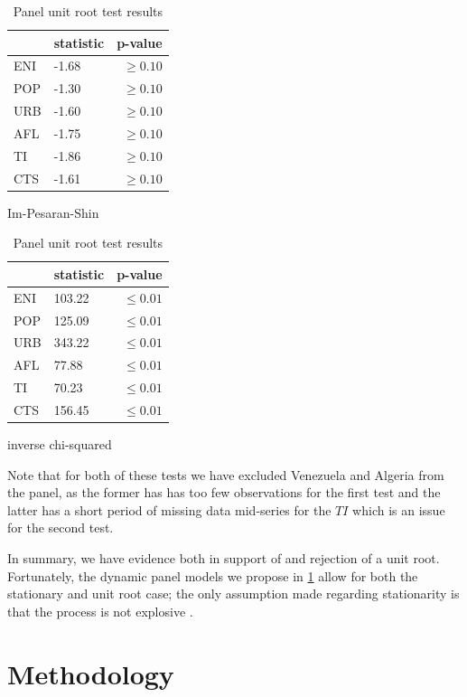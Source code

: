 \documentclass[12pt,a4paper]{article}
\begin{document}
\begin{table}[htbp]
\centering
\begin{subtable}{0.45\textwidth}
\centering
\begin{tabular}{llr}
\toprule
{} & statistic &      p-value \\
\midrule
ENI &     -1.68 &  $\geq 0.10$ \\
POP &     -1.30 &  $\geq 0.10$ \\
URB &     -1.60 &  $\geq 0.10$ \\
AFL &     -1.75 &  $\geq 0.10$ \\
TI  &     -1.86 &  $\geq 0.10$ \\
CTS &     -1.61 &  $\geq 0.10$ \\
\bottomrule
\end{tabular}
\caption{Im-Pesaran-Shin}
\label{tab:ips}
\end{subtable}
\begin{subtable}{0.45\textwidth}
\centering
\begin{tabular}{llr}
\toprule
{} & statistic &      p-value \\
\midrule
ENI &    103.22 &  $\leq 0.01$ \\
POP &    125.09 &  $\leq 0.01$ \\
URB &    343.22 &  $\leq 0.01$ \\
AFL &     77.88 &  $\leq 0.01$ \\
TI  &     70.23 &  $\leq 0.01$ \\
CTS &    156.45 &  $\leq 0.01$ \\
\bottomrule
\end{tabular}
\caption{inverse chi-squared}
\label{tab:madwu}
\end{subtable}
\caption{Panel unit root test results}
\end{table}

Note that for both of these tests we have excluded Venezuela and Algeria from the panel, as the former has has too few observations for the first test and the latter has a short period of missing data mid-series for the $TI$ which is an issue for the second test.

In summary, we have evidence both in support of and rejection of a unit root.
Fortunately, the dynamic panel models we propose in \cref{sec:methodology} allow for both the stationary and unit root case; the only assumption made regarding stationarity is that the process is not explosive \cite[p.5, A.2.1]{fritschGMMEstimationLinear2019}.


\section{Methodology}\label{sec:methodology}
\end{document}
